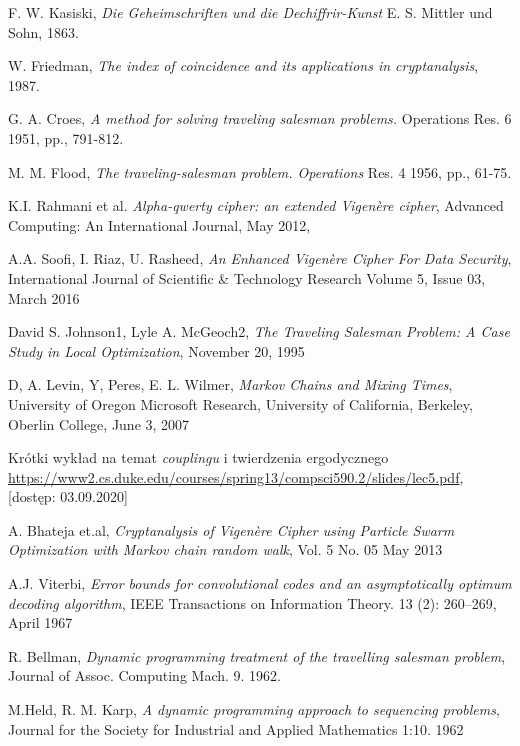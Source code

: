\documentclass[a4paper]{article}
\theoremstyle{defn}
\theoremstyle{theorem}
\theoremstyle{lemma}
\theoremstyle{cor}
\theoremstyle{fact}
\begin{document}
\begin{thebibliography}{9}
F. W. Kasiski, \emph{Die Geheimschriften und die Dechiffrir-Kunst} E. S. Mittler und Sohn, 1863.

W. Friedman, \emph{The index of coincidence and its applications in cryptanalysis}, 1987.

 G. A. Croes, \emph{A method for solving traveling salesman problems.} Operations Res. 6 1951, pp., 791-812.

 M. M. Flood, \emph{The traveling-salesman problem. Operations} Res. 4 1956, pp., 61-75.

K.I. Rahmani et al. \emph{Alpha-qwerty cipher: an extended Vigenère cipher},
Advanced Computing: An International Journal,  May 2012,

A.A. Soofi, I. Riaz, U. Rasheed,
\emph{An Enhanced Vigenère Cipher For Data Security},
International Journal of Scientific \& Technology Research Volume 5, Issue 03, March 2016

David S. Johnson1, Lyle A. McGeoch2,
\emph{The Traveling Salesman Problem:
A Case Study in Local Optimization},
November 20, 1995

D, A. Levin, Y, Peres, E. L. Wilmer,
\emph{Markov Chains and Mixing Times},
University of Oregon Microsoft Research,
University of California, Berkeley,
Oberlin College,
June 3, 2007

Krótki wykład na temat \textit{couplingu} i twierdzenia ergodycznego \href{https://www2.cs.duke.edu/courses/spring13/compsci590.2/slides/lec5.pdf}{https://www2.cs.duke.edu/courses/spring13/compsci590.2/slides/lec5.pdf}, [dostęp: 03.09.2020]

A. Bhateja et.al, \emph{Cryptanalysis of Vigenère Cipher using Particle
Swarm Optimization with Markov chain random walk}, Vol. 5 No. 05 May 2013

A.J. Viterbi,  \emph{Error bounds for convolutional codes and an asymptotically optimum decoding algorithm}, IEEE Transactions on Information Theory. 13 (2): 260–269, April 1967

 R. Bellman, \emph{Dynamic programming treatment of the travelling salesman problem}, Journal of Assoc. Computing Mach. 9. 1962.

 M.Held, R. M. Karp, \emph{A dynamic programming approach to sequencing problems},  Journal for the Society for Industrial and Applied Mathematics 1:10. 1962


\end{thebibliography}
\end{document}
